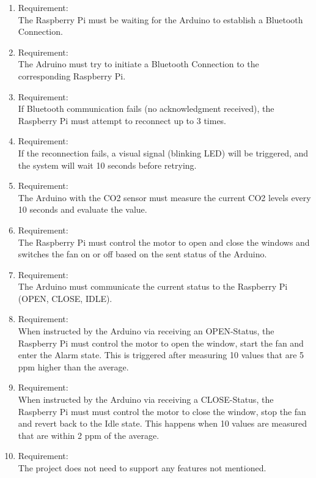     \begin{enumerate}[label*=\arabic*.]
        \item \label{qreq.1}  Requirement:  \\
        The Raspberry Pi must be waiting for the Arduino to establish a Bluetooth Connection. \\ 
        \item \label{qreq.2}  Requirement:  \\
        The Adruino must try to initiate a Bluetooth Connection to the corresponding Raspberry Pi. \\ 
        \item \label{qreq.3}  Requirement:  \\
        If Bluetooth communication fails (no acknowledgment received), the Raspberry Pi must attempt to reconnect up to 3 times. \\ 
        \item \label{qreq.4}  Requirement:  \\
        If the reconnection fails, a visual signal (blinking LED) will be triggered, and the system will wait 10 seconds before retrying. \\ 
        \item \label{qreq.5}  Requirement:  \\
        The Arduino with the CO2 sensor must measure the current CO2 levels every 10 seconds and evaluate the value. \\ 
        \item \label{qreq.6}  Requirement:  \\
        The Raspberry Pi must control the motor to open and close the windows and switches the fan on or off based on the sent status of the Arduino.\\ 
        \item \label{qreq.7}  Requirement:  \\
        The Arduino must communicate the current status to the Raspberry Pi (OPEN, CLOSE, IDLE).\\ 
        \item \label{qreq.8}  Requirement:  \\
        When instructed by the Arduino via receiving an OPEN-Status, the Raspberry Pi must control the motor to open the window, start the fan and enter the Alarm state. This is triggered after measuring 10 values that are 5 ppm higher than the average.\\ 
        \item \label{qreq.9}  Requirement:  \\
        When instructed by the Arduino via receiving a CLOSE-Status, the Raspberry Pi must must control the motor to close the window, stop the fan and revert back to the Idle state. This happens when 10 values are measured that are within 2 ppm of the average. \\ 
        \item \label{qreq.10}  Requirement:  \\
        The project does not need to support any features not mentioned. \\
        
    \end{enumerate} 
    
